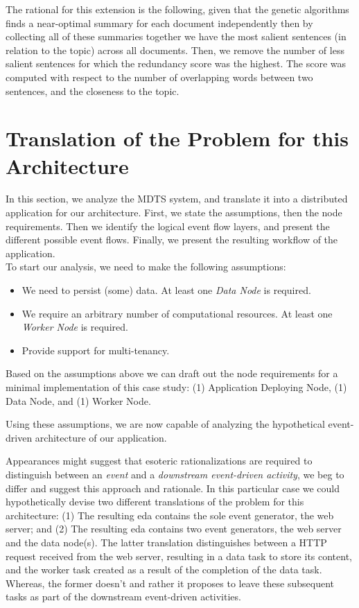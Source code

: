 \documentclass[12pt, titlepage]{uo_temp}
\begin{document}
     The rational for this extension is the following, given that the genetic algorithms
     finds a near-optimal summary for each document independently then by collecting all
     of these summaries together we have the most salient sentences (in relation to the
     topic) across all documents. Then, we remove the number of less salient sentences for
     which the redundancy score was the highest. The score was computed with respect to
     the number of overlapping words between two sentences, and the closeness to the
     topic.

     \section{Translation of the Problem for this Architecture}
     In this section, we analyze the MDTS system, and translate it into a distributed
     application for our architecture. First, we state the assumptions, then the node
     requirements. Then we identify the logical event flow layers, and present the
     different possible event flows. Finally, we present the resulting workflow of the
     application.\\

     To start our analysis, we need to make the following assumptions:
     \begin{itemize}
     \item We need to persist (some) data. At least one \emph{Data Node} is required.
     \item We require an arbitrary number of computational resources. At least one
       \emph{Worker Node} is required.
     \item Provide support for multi-tenancy.
     \end{itemize}

     Based on the assumptions above we can draft out the node requirements for a minimal
     implementation of this case study: (1) Application Deploying Node, (1) Data Node, and
     (1) Worker Node.

     Using these assumptions, we are now capable of analyzing the hypothetical event-driven
     architecture of our application. 

     Appearances might suggest that esoteric rationalizations are required to distinguish
     between an \emph{event} and a \emph{downstream event-driven activity}, we beg to
     differ and suggest this approach and rationale. In this particular case we could
     hypothetically devise two different translations of the problem for this
     architecture: (1) The resulting \gls{eda} contains the sole event generator, the web
     server; and (2) The resulting \gls{eda} contains two event generators, the web server
     and the data node(s). The latter translation distinguishes between a HTTP request
     received from the web server, resulting in a data task to store its content, and the
     worker task created as a result of the completion of the data task. Whereas, the
     former doesn't and rather it proposes to leave these subsequent tasks as part of the
     downstream event-driven activities.
     
\end{document}

